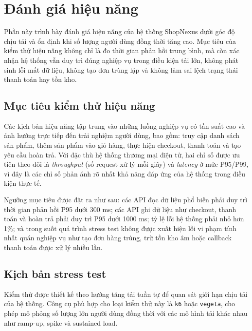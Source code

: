 
\section{Đánh giá hiệu năng}
\label{sec:impl-performance}

Phần này trình bày đánh giá hiệu năng của hệ thống ShopNexus dưới góc độ chịu tải và ổn định khi số lượng người dùng đồng thời tăng cao. Mục tiêu của kiểm thử hiệu năng không chỉ là đo thời gian phản hồi trung bình, mà còn xác nhận hệ thống vẫn duy trì đúng nghiệp vụ trong điều kiện tải lớn, không phát sinh lỗi mất dữ liệu, không tạo đơn trùng lặp và không làm sai lệch trạng thái thanh toán hay tồn kho.

\subsection{Mục tiêu kiểm thử hiệu năng}
\label{subsec:perf-goals}

Các kịch bản hiệu năng tập trung vào những luồng nghiệp vụ có tần suất cao và ảnh hưởng trực tiếp đến trải nghiệm người dùng, bao gồm: truy cập danh sách sản phẩm, thêm sản phẩm vào giỏ hàng, thực hiện checkout, thanh toán và tạo yêu cầu hoàn trả. Với đặc thù hệ thống thương mại điện tử, hai chỉ số được ưu tiên theo dõi là \textit{throughput} (số request xử lý mỗi giây) và \textit{latency} ở mức P95/P99, vì đây là các chỉ số phản ánh rõ nhất khả năng đáp ứng của hệ thống trong điều kiện thực tế.

Ngưỡng mục tiêu được đặt ra như sau: các API đọc dữ liệu phổ biến phải duy trì thời gian phản hồi P95 dưới 300 ms; các API ghi dữ liệu như checkout, thanh toán và hoàn trả phải duy trì P95 dưới 1000 ms; tỷ lệ lỗi hệ thống phải nhỏ hơn 1\%; và trong suốt quá trình stress test không được xuất hiện lỗi vi phạm tính nhất quán nghiệp vụ như tạo đơn hàng trùng, trừ tồn kho âm hoặc callback thanh toán được xử lý nhiều lần.

\subsection{Kịch bản stress test}
\label{subsec:stress-test-scenarios}

Kiểm thử được thiết kế theo hướng tăng tải tuần tự để quan sát giới hạn chịu tải của hệ thống. Công cụ phù hợp cho loại kiểm thử này là \texttt{k6} hoặc \texttt{vegeta}, cho phép mô phỏng số lượng lớn người dùng đồng thời với các mô hình tải khác nhau như ramp-up, spike và sustained load.

